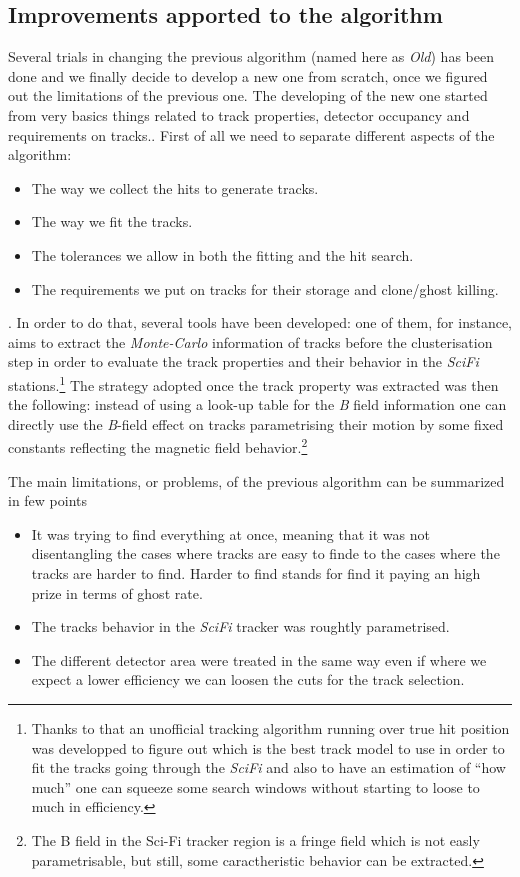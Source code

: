 \documentclass[paper=a4, fontsize=10pt]{scrartcl}
\numberwithin{equation}{section}		%
\numberwithin{figure}{section}			%
\numberwithin{table}{section}				%
\begin{document}
\begin{itemize}
\subsection{Improvements apported to the algorithm}
Several trials in changing the previous algorithm (named here as \textit{Old}) has been done and we finally decide to develop a new one from scratch, once we figured out the limitations of the previous one. The developing of the new one started from very basics things related to track properties, detector occupancy and requirements on tracks.. First of all we need to separate different aspects of the algorithm: 
\begin{itemize}
\item{The way we collect the hits to generate tracks.}
\item{The way we fit the tracks.}
\item{The tolerances we allow in both the fitting and the hit search.}
\item{The requirements we put on tracks for their storage and clone/ghost killing.}
\end{itemize}.
In order to do that, several tools have been developed: one of them, for instance, aims to extract the \textit{Monte-Carlo} information of tracks before the clusterisation step in order to evaluate the track properties and their behavior in the \textit{SciFi} stations.\footnote{Thanks to that an unofficial tracking algorithm running over true hit position was developped to figure out which is the best track model to use in order to fit the tracks going through the \textit{SciFi} and also to have an estimation of ``how much'' one can squeeze some search windows without starting to loose to much in efficiency.} The strategy adopted once the track property was extracted was then the following: instead of using a look-up table for the \textit{B} field information one can directly use the \textit{B}-field effect on tracks parametrising their motion by some fixed constants reflecting the magnetic field behavior.\footnote{The B field in the Sci-Fi tracker region is a fringe field which is not easly parametrisable, but still, some caractheristic behavior can be extracted.}

The main limitations, or problems, of the previous algorithm can be summarized in few points \begin{itemize} \item{It was trying to find everything at once, meaning that it was not disentangling the cases where tracks are easy to finde to the cases where the tracks are harder to find. Harder to find stands for find it paying an high prize in terms of ghost rate.} \item{The tracks behavior in the \textit{SciFi} tracker was roughtly parametrised.} \item{The different detector area were treated in the same way even if where we expect a lower efficiency we can loosen the cuts for the track selection.}
\end{itemize}


\end{itemize}
\end{document}
